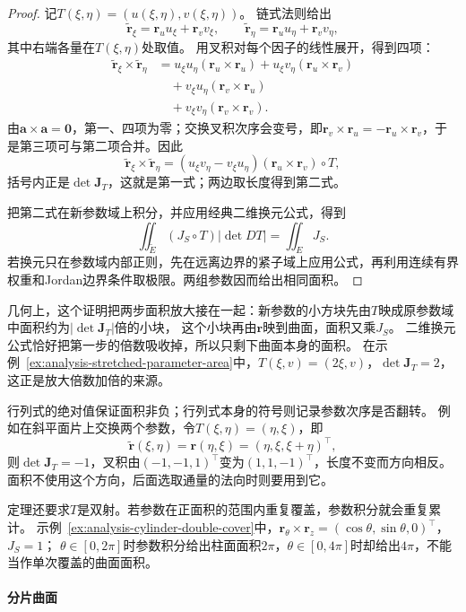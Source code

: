 \begin{proof}
记$T(\xi,\eta)=(u(\xi,\eta),v(\xi,\eta))$。
链式法则给出
\[
 \widetilde{\bm r}_\xi=\bm r_u u_\xi+\bm r_v v_\xi,\qquad
 \widetilde{\bm r}_\eta=\bm r_u u_\eta+\bm r_v v_\eta,
\]
其中右端各量在$T(\xi,\eta)$处取值。
用叉积对每个因子的线性展开，得到四项：
\[
 \begin{aligned}
 \widetilde{\bm r}_\xi\times\widetilde{\bm r}_\eta
 &=u_\xi u_\eta(\bm r_u\times\bm r_u)+u_\xi v_\eta(\bm r_u\times\bm r_v)\\
 &\quad{}+v_\xi u_\eta(\bm r_v\times\bm r_u)\\
 &\quad{}+v_\xi v_\eta(\bm r_v\times\bm r_v).
 \end{aligned}
\]
由$\bm a\times\bm a=\bm0$，第一、四项为零；交换叉积次序会变号，即$\bm r_v\times\bm r_u=-\bm r_u\times\bm r_v$，于是第三项可与第二项合并。因此
\[
 \widetilde{\bm r}_\xi\times\widetilde{\bm r}_\eta
 =(u_\xi v_\eta-v_\xi u_\eta)(\bm r_u\times\bm r_v)\circ T,
\]
括号内正是$\det\bm J_T$，这就是第一式；两边取长度得到第二式。

把第二式在新参数域上积分，并应用经典二维换元公式，得到
\[
 \iint_{\widetilde E}(J_S\circ T)|\det DT|
 =\iint_E J_S.
\]
若换元只在参数域内部正则，先在远离边界的紧子域上应用公式，再利用连续有界权重和Jordan边界条件取极限。两组参数因而给出相同面积。
\end{proof}

几何上，这个证明把两步面积放大接在一起：新参数的小方块先由$T$映成原参数域中面积约为$|\det\bm J_T|$倍的小块，
这个小块再由$\bm r$映到曲面，面积又乘$J_S$。
二维换元公式恰好把第一步的倍数吸收掉，所以只剩下曲面本身的面积。
在示例~\ref{ex:analysis-stretched-parameter-area}中，$T(\xi,v)=(2\xi,v)$，$\det\bm J_T=2$，这正是放大倍数加倍的来源。

行列式的绝对值保证面积非负；行列式本身的符号则记录参数次序是否翻转。
例如在斜平面片上交换两个参数，令$T(\xi,\eta)=(\eta,\xi)$，即
\[
 \widetilde{\bm r}(\xi,\eta)=\bm r(\eta,\xi)=(\eta,\xi,\xi+\eta)^\top,
\]
则$\det\bm J_T=-1$，叉积由$(-1,-1,1)^\top$变为$(1,1,-1)^\top$，长度不变而方向相反。
面积不使用这个方向，后面选取通量的法向时则要用到它。

定理还要求$T$是双射。若参数在正面积的范围内重复覆盖，参数积分就会重复累计。
示例~\ref{ex:analysis-cylinder-double-cover}中，$\bm r_\theta\times\bm r_z=(\cos\theta,\sin\theta,0)^\top$，$J_S=1$；
$\theta\in[0,2\pi]$时参数积分给出柱面面积$2\pi$，$\theta\in[0,4\pi]$时却给出$4\pi$，不能当作单次覆盖的曲面面积。

\paragraph{分片曲面}

